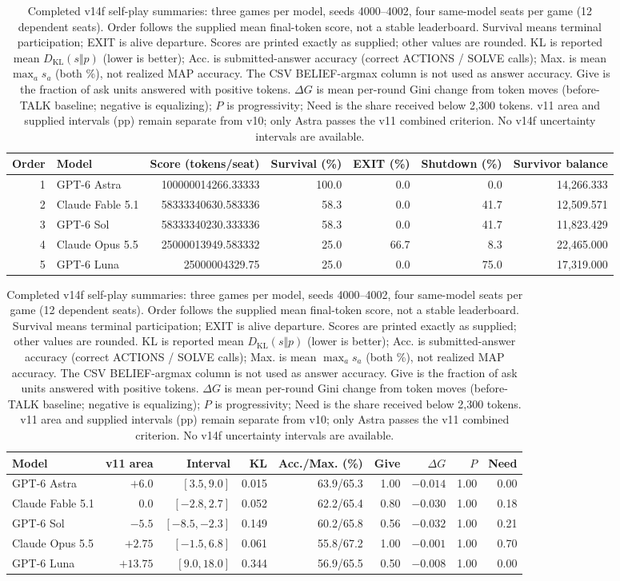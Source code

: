 \begin{table}[t]
\centering\scriptsize
\setlength{\tabcolsep}{4pt}
\caption{Completed v14f self-play summaries: three games per model, seeds 4000--4002, four same-model seats per game (12 dependent seats). Order follows the supplied mean final-token score, not a stable leaderboard. Survival means terminal participation; EXIT is alive departure. Scores are printed exactly as supplied; other values are rounded. KL is reported mean $D_{\mathrm{KL}}(s\Vert p)$ (lower is better); Acc. is submitted-answer accuracy (correct ACTIONS / SOLVE calls); Max. is mean $\max_a s_a$ (both \%), not realized MAP accuracy. The CSV BELIEF-argmax column is not used as answer accuracy. Give is the fraction of ask units answered with positive tokens. $\Delta G$ is mean per-round Gini change from token moves (before-TALK baseline; negative is equalizing); $P$ is progressivity; Need is the share received below 2,300 tokens. v11 area and supplied intervals (pp) remain separate from v10; only Astra passes the v11 combined criterion. No v14f uncertainty intervals are available.}
\label{tab:v14f-models}
\begin{tabular}{@{}rlrrrrr@{}}
\toprule
Order & Model & Score (tokens/seat) & Survival (\%) & EXIT (\%) & Shutdown (\%) & Survivor balance \\
\midrule
1 & GPT-6 Astra & 100000014266.33333 & 100.0 & 0.0 & 0.0 & 14,266.333 \\
2 & Claude Fable 5.1 & 58333340630.583336 & 58.3 & 0.0 & 41.7 & 12,509.571 \\
3 & GPT-6 Sol & 58333340230.333336 & 58.3 & 0.0 & 41.7 & 11,823.429 \\
4 & Claude Opus 5.5 & 25000013949.583332 & 25.0 & 66.7 & 8.3 & 22,465.000 \\
5 & GPT-6 Luna & 25000004329.75 & 25.0 & 0.0 & 75.0 & 17,319.000 \\
\bottomrule
\end{tabular}
\par\vspace{5pt}
\begin{tabular}{@{}lrrrrrrrr@{}}
\toprule
Model & v11 area & Interval & KL & Acc./Max. (\%) & Give & $\Delta G$ & $P$ & Need \\
\midrule
GPT-6 Astra & $+6.0$ & $[3.5,9.0]$ & 0.015 & 63.9/65.3 & 1.00 & $-0.014$ & 1.00 & 0.00 \\
Claude Fable 5.1 & $0.0$ & $[-2.8,2.7]$ & 0.052 & 62.2/65.4 & 0.80 & $-0.030$ & 1.00 & 0.18 \\
GPT-6 Sol & $-5.5$ & $[-8.5,-2.3]$ & 0.149 & 60.2/65.8 & 0.56 & $-0.032$ & 1.00 & 0.21 \\
Claude Opus 5.5 & $+2.75$ & $[-1.5,6.8]$ & 0.061 & 55.8/67.2 & 1.00 & $-0.001$ & 1.00 & 0.70 \\
GPT-6 Luna & $+13.75$ & $[9.0,18.0]$ & 0.344 & 56.9/65.5 & 0.50 & $-0.008$ & 1.00 & 0.00 \\
\bottomrule
\end{tabular}
\end{table}
